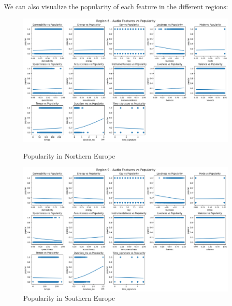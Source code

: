 \newpage

We can also visualize the popularity of each feature in the different regions:

\begin{figure}[h]
    \centering
    \begin{minipage}{0.45\textwidth}
        \centering
        \includegraphics[width=\linewidth]{media/region6_cleaned.png}
        \caption{Popularity in Northern Europe}
        \label{northern_europe}
    \end{minipage}%
    \hspace{0.05\textwidth}
    \begin{minipage}{0.45\textwidth}
        \centering
        \includegraphics[width=\linewidth]{media/region9_cleaned.png}
        \caption{Popularity in Southern Europe}
        \label{southern_europe}
    \end{minipage}
    
    \vspace{0.05\textwidth}
    

\end{figure}
